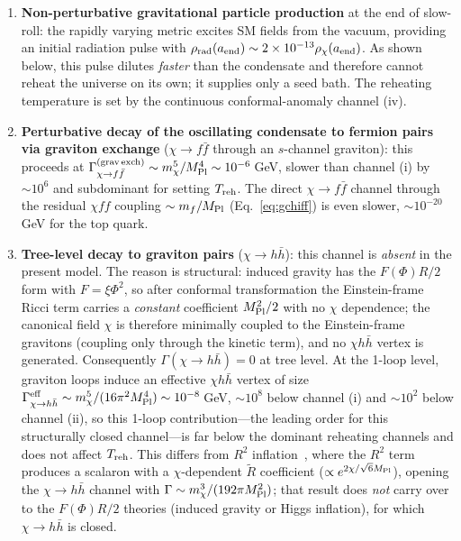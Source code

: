 \documentclass[pdflatex,sn-mathphys-num]{sn-jnl}
\newcommand{\MP}{M_{\rm Pl}}
\theoremstyle{thmstyleone}
\begin{document}
\begin{enumerate}
\item[(i)] \textbf{Non-perturbative gravitational particle production} at the end of slow-roll: the rapidly varying metric excites SM fields from the vacuum, providing an initial radiation pulse with $\rho_{\rm rad}(a_{\rm end})\sim2\times10^{-13}\rho_\chi(a_{\rm end})$. As shown below, this pulse dilutes \emph{faster} than the condensate and therefore cannot reheat the universe on its own; it supplies only a seed bath. The reheating temperature is set by the continuous conformal-anomaly channel (iv).

\item[(ii)] \textbf{Perturbative decay of the oscillating condensate to fermion pairs via graviton exchange} ($\chi\to f\bar f$ through an $s$-channel graviton): this proceeds at $\Gamma^{\rm (grav\,exch)}_{\chi\to f\bar f}\sim m_\chi^5/\MP^4\sim10^{-6}\,$GeV, slower than channel (i) by $\sim10^6$ and subdominant for setting $T_{\rm reh}$. The direct $\chi\to f\bar f$ channel through the residual $\chi ff$ coupling $\sim m_f/\MP$ (Eq.~\eqref{eq:gchiff}) is even slower, $\sim10^{-20}\,$GeV for the top quark.

\item[(iii)] \textbf{Tree-level decay to graviton pairs} ($\chi\to h\bar h$): this channel is \emph{absent} in the present model. The reason is structural: induced gravity has the $F(\Phi)R/2$ form with $F=\xi\Phi^2$, so after conformal transformation the Einstein-frame Ricci term carries a \emph{constant} coefficient $\MP^2/2$ with no $\chi$ dependence; the canonical field $\chi$ is therefore minimally coupled to the Einstein-frame gravitons (coupling only through the kinetic term), and no $\chi h\bar h$ vertex is generated. Consequently $\Gamma(\chi\to h\bar h)=0$ at tree level. At the 1-loop level, graviton loops induce an effective $\chi h\bar h$ vertex of size $\Gamma^{\rm eff}_{\chi\to h\bar h}\sim m_\chi^5/(16\pi^2\MP^4)\sim10^{-8}\,$GeV, $\sim10^8$ below channel (i) and $\sim10^2$ below channel (ii), so this 1-loop contribution---the leading order for this structurally closed channel---is far below the dominant reheating channels and does not affect $T_{\rm reh}$. This differs from $R^2$ inflation~\cite{Starobinsky1980}, where the $R^2$ term produces a scalaron with a $\chi$-dependent $\tilde R$ coefficient ($\propto e^{2\chi/\sqrt{6}\MP}$), opening the $\chi\to h\bar h$ channel with $\Gamma\sim m_\chi^3/(192\pi\MP^2)$; that result does \emph{not} carry over to the $F(\Phi)R/2$ theories (induced gravity or Higgs inflation), for which $\chi\to h\bar h$ is closed.


\end{enumerate}
\end{document}
